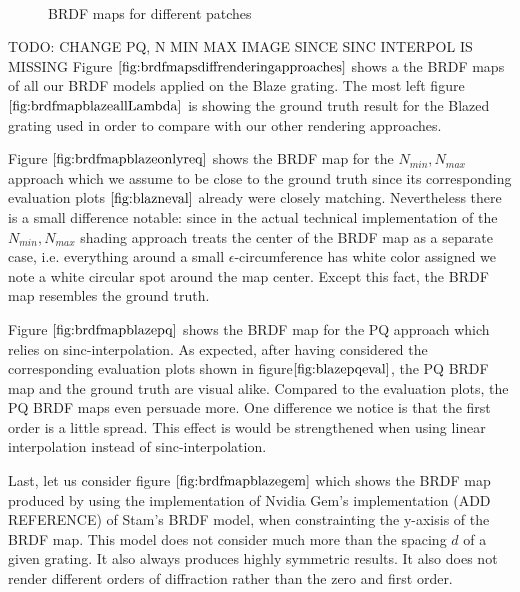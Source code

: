 \begin{figure}[H]
  \centering
~
~

\caption{BRDF maps for different patches}
\label{fig:brdfmapsdiffpatches}
\end{figure}

TODO:  CHANGE PQ, N MIN MAX IMAGE SINCE SINC INTERPOL IS MISSING
Figure $\ref{fig:brdfmapsdiffrenderingapproaches}$ shows a the BRDF maps of all our BRDF models applied on the Blaze grating. The most left figure $\ref{fig:brdfmapblazeallLambda}$ is showing the ground truth result for the Blazed grating used in order to compare with our other rendering approaches.

Figure $\ref{fig:brdfmapblazeonlyreq}$ shows the BRDF map for the $N_{min}, N_{max}$ approach which we assume to be close to the ground truth since its corresponding evaluation plots $\ref{fig:blazneval}$ already were closely matching. Nevertheless there is a small difference notable: since in the actual technical implementation of the $N_{min}, N_{max}$ shading approach treats the center of the BRDF map as a separate case, i.e. everything around a small $\epsilon$-circumference has white color assigned 
we note a white circular spot around the map center. Except this fact, the BRDF map resembles the ground truth.

Figure $\ref{fig:brdfmapblazepq}$ shows the BRDF map for the PQ approach which relies on sinc-interpolation. As expected, after having considered the corresponding evaluation plots shown in figure$\ref{fig:blazepqeval}$, the PQ BRDF map and the ground truth are visual alike. Compared to the evaluation plots, the PQ BRDF maps even persuade more. One difference we notice is that the first order is a little spread. This effect is would be strengthened when using linear interpolation instead of sinc-interpolation.

Last, let us consider figure $\ref{fig:brdfmapblazegem}$ which shows the BRDF map produced by using the implementation of Nvidia Gem's implementation (ADD REFERENCE) of Stam's BRDF model, when constrainting the y-axisis of the BRDF map. This model does not consider much more than the spacing $d$ of a given grating. It also always produces highly symmetric results. It also does not render different orders of diffraction rather than the zero and first order.   

